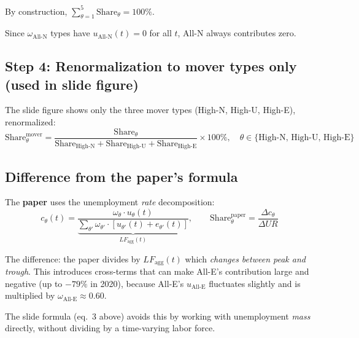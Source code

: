 \documentclass[12pt]{article}
\begin{document}
By construction, $\sum_{\theta=1}^{5} \text{Share}_\theta = 100\%$.

\medskip

Since $\omega_{\mathrm{All\text{-}N}}$ types have $u_{\mathrm{All\text{-}N}}(t) = 0$ for all $t$, All-N always contributes zero.

\subsection*{Step 4: Renormalization to mover types only (used in slide figure)}

The slide figure shows only the three mover types (High-N, High-U, High-E), renormalized:
\begin{equation}
  \text{Share}_\theta^{\mathrm{mover}} = \frac{\text{Share}_\theta}{\text{Share}_{\mathrm{High\text{-}N}} + \text{Share}_{\mathrm{High\text{-}U}} + \text{Share}_{\mathrm{High\text{-}E}}} \times 100\%, \quad \theta \in \{\text{High-N, High-U, High-E}\}
\end{equation}

\subsection*{Difference from the paper's formula}

The \textbf{paper} uses the unemployment \emph{rate} decomposition:
\begin{equation}
  c_\theta(t) = \frac{\omega_\theta \cdot u_\theta(t)}{\underbrace{\sum_{\theta'} \omega_{\theta'} \cdot [u_{\theta'}(t) + e_{\theta'}(t)]}_{LF_{\mathrm{agg}}(t)}}, \qquad \text{Share}_\theta^{\mathrm{paper}} = \frac{\Delta c_\theta}{\Delta UR}
\end{equation}

The difference: the paper divides by $LF_{\mathrm{agg}}(t)$ which \emph{changes between peak and trough}. This introduces cross-terms that can make All-E's contribution large and negative (up to $-79\%$ in 2020), because All-E's $u_{\mathrm{All\text{-}E}}$ fluctuates slightly and is multiplied by $\omega_{\mathrm{All\text{-}E}} \approx 0.60$.

The slide formula (eq.~3 above) avoids this by working with unemployment \emph{mass} directly, without dividing by a time-varying labor force.
\end{document}
